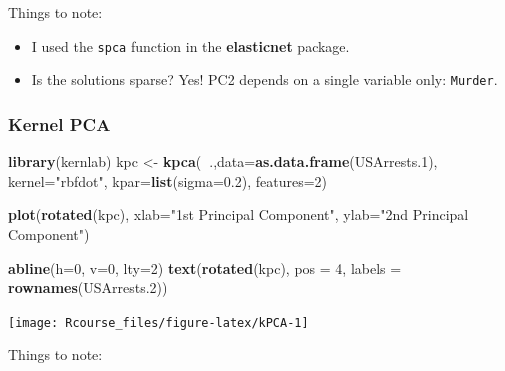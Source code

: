 \documentclass[]{book}
\newenvironment{Shaded}{\begin{snugshade}}{\end{snugshade}}
\newcommand{\KeywordTok}[1]{\textcolor[rgb]{0.13,0.29,0.53}{\textbf{#1}}}
\newcommand{\DataTypeTok}[1]{\textcolor[rgb]{0.13,0.29,0.53}{#1}}
\newcommand{\DecValTok}[1]{\textcolor[rgb]{0.00,0.00,0.81}{#1}}
\newcommand{\FloatTok}[1]{\textcolor[rgb]{0.00,0.00,0.81}{#1}}
\newcommand{\StringTok}[1]{\textcolor[rgb]{0.31,0.60,0.02}{#1}}
\newcommand{\OperatorTok}[1]{\textcolor[rgb]{0.81,0.36,0.00}{\textbf{#1}}}
\newcommand{\NormalTok}[1]{#1}
\providecommand{\tightlist}{%
  \setlength{\itemsep}{0pt}\setlength{\parskip}{0pt}}
\theoremstyle{definition}
\theoremstyle{definition}
\theoremstyle{definition}
\theoremstyle{remark}
\begin{document}
Things to note:

\begin{itemize}
\tightlist
\item
  I used the \texttt{spca} function in the \textbf{elasticnet} package.
\item
  Is the solutions sparse? Yes! PC2 depends on a single variable only:
  \texttt{Murder}.
\end{itemize}

\subsubsection{Kernel PCA}\label{kernel-pca}

\begin{Shaded}
\begin{Highlighting}[]
\KeywordTok{library}\NormalTok{(kernlab)}
\NormalTok{kpc <-}\StringTok{ }\KeywordTok{kpca}\NormalTok{(}\OperatorTok{~}\NormalTok{.,}\DataTypeTok{data=}\KeywordTok{as.data.frame}\NormalTok{(USArrests.}\DecValTok{1}\NormalTok{), }\DataTypeTok{kernel=}\StringTok{"rbfdot"}\NormalTok{, }\DataTypeTok{kpar=}\KeywordTok{list}\NormalTok{(}\DataTypeTok{sigma=}\FloatTok{0.2}\NormalTok{), }\DataTypeTok{features=}\DecValTok{2}\NormalTok{)}

\KeywordTok{plot}\NormalTok{(}\KeywordTok{rotated}\NormalTok{(kpc),}
     \DataTypeTok{xlab=}\StringTok{"1st Principal Component"}\NormalTok{,}
     \DataTypeTok{ylab=}\StringTok{"2nd Principal Component"}\NormalTok{)}

\KeywordTok{abline}\NormalTok{(}\DataTypeTok{h=}\DecValTok{0}\NormalTok{, }\DataTypeTok{v=}\DecValTok{0}\NormalTok{, }\DataTypeTok{lty=}\DecValTok{2}\NormalTok{)}
\KeywordTok{text}\NormalTok{(}\KeywordTok{rotated}\NormalTok{(kpc), }\DataTypeTok{pos =} \DecValTok{4}\NormalTok{, }\DataTypeTok{labels =} \KeywordTok{rownames}\NormalTok{(USArrests.}\DecValTok{2}\NormalTok{))}
\end{Highlighting}
\end{Shaded}

\texttt{[image: Rcourse\_files/figure-latex/kPCA-1]}

Things to note:
\end{document}
